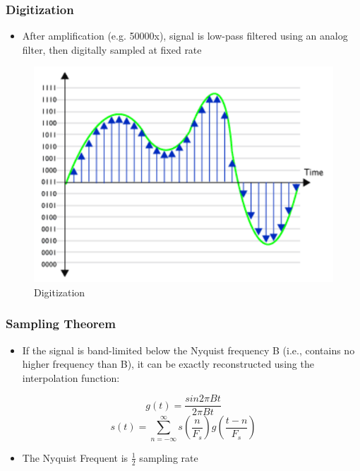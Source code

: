 \documentclass{beamer}
\begin{document}
\begin{frame}
\frametitle{Digitization}
\begin{itemize}
	\item After amplification (e.g. 50000x), signal is low-pass filtered using an analog filter, then digitally sampled at fixed rate
\end{itemize}
\begin{figure}
	\includegraphics[width=0.7\linewidth]{image/digitalization}
	\caption{Digitization}
\end{figure}
\end{frame}

\begin{frame}
\frametitle{Sampling Theorem}
\begin{itemize}
	\item If the signal is band-limited below the Nyquist frequency B (i.e., contains no higher frequency than B), it can be exactly reconstructed using the interpolation function:
\end{itemize}
\begin{equation}
	g(t) = \frac{sin2\pi Bt}{2\pi Bt}
\end{equation}
\begin{equation}
	s(t) = \sum_{n=-\infty}^{\infty}s\left(\frac{n}{F_s}\right) g\left(\frac{t-n}{F_s}\right)
\end{equation}
\begin{itemize}
	\item The Nyquist Frequent is $\frac{1}{2}$ sampling rate
\end{itemize}
\end{frame}
\end{document}
